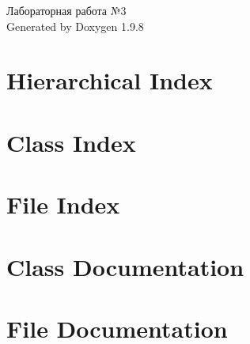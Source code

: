 \documentclass[twoside]{book}
\newcommand{\+}{\discretionary{\mbox{\scriptsize$\hookleftarrow$}}{}{}}
\newcommand{\clearemptydoublepage}{%
    \newpage{\pagestyle{empty}\cleardoublepage}%
  }
\begin{document}
  \raggedbottom
    \hypersetup{pageanchor=false,
                bookmarksnumbered=true,
                pdfencoding=unicode
               }
  \begin{titlepage}
  \vspace*{7cm}
  \begin{center}%
  {\Large Лабораторная работа №3}\\
  \vspace*{1cm}
  {\large Generated by Doxygen 1.9.8}\\
  \end{center}
  \end{titlepage}
  \clearemptydoublepage
  \tableofcontents
  \clearemptydoublepage
  \hypersetup{pageanchor=true}

\chapter{Hierarchical Index}

\chapter{Class Index}

\chapter{File Index}

\chapter{Class Documentation}






\chapter{File Documentation}
















  \backmatter
  \newpage
  \clearemptydoublepage
  \printindex
\end{document}
